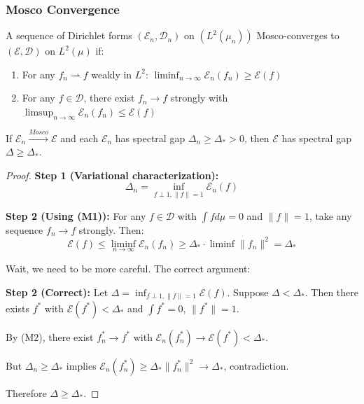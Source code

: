 \subsubsection{Mosco Convergence}

\begin{definition}
A sequence of Dirichlet forms $(\mathcal{E}_n, \mathcal{D}_n)$ on $(L^2(\mu_n))$ Mosco-converges to $(\mathcal{E}, \mathcal{D})$ on $L^2(\mu)$ if:
\begin{enumerate}
\item[(M1)] For any $f_n \rightharpoonup f$ weakly in $L^2$: $\liminf_{n \to \infty} \mathcal{E}_n(f_n) \geq \mathcal{E}(f)$
\item[(M2)] For any $f \in \mathcal{D}$, there exist $f_n \to f$ strongly with $\limsup_{n \to \infty} \mathcal{E}_n(f_n) \leq \mathcal{E}(f)$
\end{enumerate}
\end{definition}

\begin{theorem}
\label{thm:mosco_gap}
If $\mathcal{E}_n \xrightarrow{Mosco} \mathcal{E}$ and each $\mathcal{E}_n$ has spectral gap $\Delta_n \geq \Delta_* > 0$, then $\mathcal{E}$ has spectral gap $\Delta \geq \Delta_*$.
\end{theorem}

\begin{proof}
\textbf{Step 1 (Variational characterization):}
\begin{equation}
\Delta_n = \inf_{f \perp 1, \|f\|=1} \mathcal{E}_n(f)
\end{equation}

\textbf{Step 2 (Using (M1)):}
For any $f \in \mathcal{D}$ with $\int f d\mu = 0$ and $\|f\| = 1$, take any sequence $f_n \to f$ strongly. Then:
\begin{equation}
\mathcal{E}(f) \leq \liminf_{n \to \infty} \mathcal{E}_n(f_n) \geq \Delta_* \cdot \liminf \|f_n\|^2 = \Delta_*
\end{equation}

Wait, we need to be more careful. The correct argument:

\textbf{Step 2 (Correct):}
Let $\Delta = \inf_{f \perp 1, \|f\|=1} \mathcal{E}(f)$. Suppose $\Delta < \Delta_*$. Then there exists $f^*$ with $\mathcal{E}(f^*) < \Delta_*$ and $\int f^* = 0$, $\|f^*\| = 1$.

By (M2), there exist $f^*_n \to f^*$ with $\mathcal{E}_n(f^*_n) \to \mathcal{E}(f^*) < \Delta_*$.

But $\Delta_n \geq \Delta_*$ implies $\mathcal{E}_n(f^*_n) \geq \Delta_* \|f^*_n\|^2 \to \Delta_*$, contradiction.

Therefore $\Delta \geq \Delta_*$.
\end{proof}

